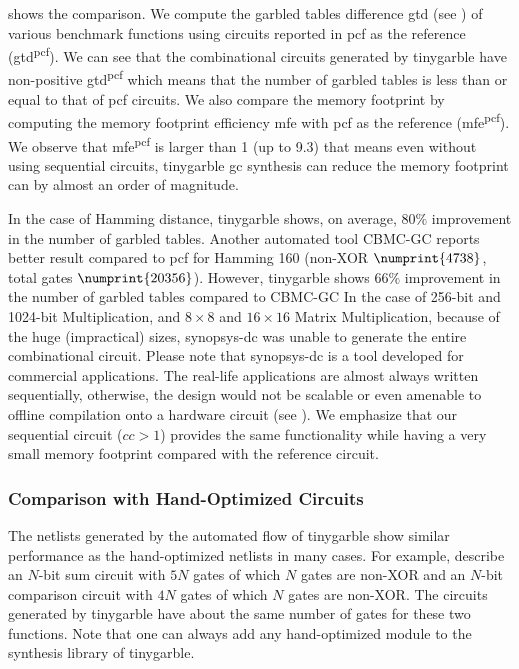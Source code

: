  shows the comparison.
We compute the garbled tables difference \acrshort{gtd} (see ) of various benchmark functions using circuits reported in \gls{pcf} as the reference (\acrshort{gtd}\textsuperscript{\gls{pcf}}).
We can see that the combinational circuits generated by \gls{tinygarble} have non-positive \acrshort{gtd}\textsuperscript{\gls{pcf}} which means that the number of garbled tables is less than or equal to that of \gls{pcf} circuits.
We also compare the memory footprint by computing the memory footprint efficiency \acrshort{mfe} with \gls{pcf} as the reference (\acrshort{mfe}\textsuperscript{\gls{pcf}}).
We observe that \acrshort{mfe}\textsuperscript{\gls{pcf}} is larger than 1 (up to 9.3) that means even without using sequential circuits, \gls{tinygarble} \acrshort{gc} synthesis can reduce the memory footprint can by almost an order of magnitude.

In the case of Hamming distance, \gls{tinygarble} shows, on average, $80\%$ improvement in the number of garbled tables.
Another automated tool CBMC-GC \cite{franz2014cbmc} reports better result compared to \gls{pcf} for Hamming 160 (non-XOR $\numprint{4738}$, total gates $\numprint{20356}$).
However, \gls{tinygarble} shows $66\%$ improvement in the number of garbled tables compared to CBMC-GC
In the case of 256-bit and 1024-bit Multiplication, and $8\times 8$ and $16\times 16$ Matrix Multiplication, because of the huge (impractical) sizes, \gls{synopsys-dc} was unable to generate the entire combinational circuit.
Please note that \gls{synopsys-dc} is a tool developed for commercial applications.
The real-life applications are almost always written sequentially, otherwise, the design would not be scalable or even amenable to offline compilation onto a hardware circuit (see ).
We emphasize that our sequential circuit ($cc>1$) provides the same functionality while having a very small memory footprint compared with the reference circuit.

\subsubsection{Comparison with Hand-Optimized Circuits} \label{sssec:eval-tinygarble-comb-hand}
The \gls{netlist}s generated by the automated flow of \gls{tinygarble} show similar performance as the hand-optimized \gls{netlist}s in many cases.
For example, \cite{kolesnikov2009improved} describe an $N$-bit sum circuit with $5N$ gates of which $N$ gates are non-XOR and an $N$-bit comparison circuit with $4N$ gates of which $N$ gates are non-XOR.
The circuits generated by \gls{tinygarble} have about the same number of gates for these two functions.
Note that one can always add any hand-optimized module to the synthesis library of \gls{tinygarble}.

